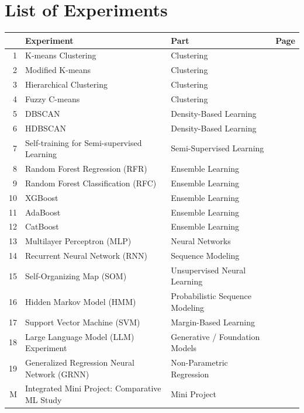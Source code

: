 \documentclass[11pt,a4paper]{report}
\begin{document}
\chapter*{List of Experiments}
\begin{longtable}{|r|p{6.7cm}|p{4.9cm}|r|}
\hline
\tablehead{\textbf{No.} & \textbf{Experiment} & \textbf{Part} & \textbf{Page}} \\
\hline
\endhead
1 & K-means Clustering & Clustering & \pageref{exp:01} \\
\hline
2 & Modified K-means & Clustering & \pageref{exp:02} \\
\hline
3 & Hierarchical Clustering & Clustering & \pageref{exp:03} \\
\hline
4 & Fuzzy C-means & Clustering & \pageref{exp:04} \\
\hline
5 & DBSCAN & Density-Based Learning & \pageref{exp:05} \\
\hline
6 & HDBSCAN & Density-Based Learning & \pageref{exp:06} \\
\hline
7 & Self-training for Semi-supervised Learning & Semi-Supervised Learning & \pageref{exp:07} \\
\hline
8 & Random Forest Regression (RFR) & Ensemble Learning & \pageref{exp:08} \\
\hline
9 & Random Forest Classification (RFC) & Ensemble Learning & \pageref{exp:09} \\
\hline
10 & XGBoost & Ensemble Learning & \pageref{exp:10} \\
\hline
11 & AdaBoost & Ensemble Learning & \pageref{exp:11} \\
\hline
12 & CatBoost & Ensemble Learning & \pageref{exp:12} \\
\hline
13 & Multilayer Perceptron (MLP) & Neural Networks & \pageref{exp:13} \\
\hline
14 & Recurrent Neural Network (RNN) & Sequence Modeling & \pageref{exp:14} \\
\hline
15 & Self-Organizing Map (SOM) & Unsupervised Neural Learning & \pageref{exp:15} \\
\hline
16 & Hidden Markov Model (HMM) & Probabilistic Sequence Modeling & \pageref{exp:16} \\
\hline
17 & Support Vector Machine (SVM) & Margin-Based Learning & \pageref{exp:17} \\
\hline
18 & Large Language Model (LLM) Experiment & Generative / Foundation Models & \pageref{exp:18} \\
\hline
19 & Generalized Regression Neural Network (GRNN) & Non-Parametric Regression & \pageref{exp:19} \\
\hline
M & Integrated Mini Project: Comparative ML Study & Mini Project & \pageref{exp:mini} \\
\hline
\end{longtable}
\end{document}
